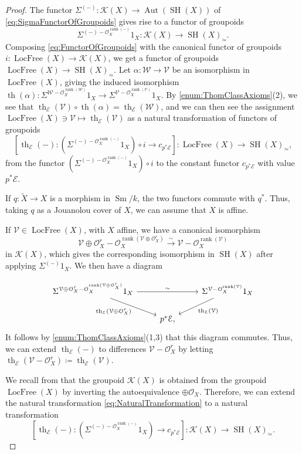 \documentclass[10pt]{amsart}
\theoremstyle{definition}
\theoremstyle{plain}
\numberwithin{equation}{section}
\newcommand{\0}{\emptyset}
\newcommand{\sE}{{\mathcal E}}
\newcommand{\sK}{{\mathcal K}}
\newcommand{\sO}{{\mathcal O}}
\newcommand{\sV}{{\mathcal V}}
\newcommand{\sW}{{\mathcal W}}
\newcommand{\SH}{{\operatorname{SH}}}
\newcommand{\Sm}{{\operatorname{Sm}}}
\renewcommand{\th}{{\operatorname{th}}}
\newcommand{\rnk}{{\operatorname{rank}}}
\newcommand{\Aut}{{\operatorname{Aut}}}
\newcommand{\Locfree}{{\operatorname{LocFree}}}
\begin{document}
\begin{proof}
    The functor $\Sigma^{(-)}:\sK(X)\to \Aut(\SH(X))$ of \eqref{eq:SigmaFunctorOfGroupoids} gives rise to a functor of groupoids 
    \begin{equation}
    \label{eq:FunctorOfGroupoids}
        \Sigma^{(-)-\sO_X^{\rnk(-)}}1_X:\sK(X)\to \SH(X)_\simeq.
    \end{equation}
Composing \eqref{eq:FunctorOfGroupoids} with the canonical functor of groupoids $i:\Locfree(X) \to \sK(X)$, we get a functor of groupoids $\Locfree(X) \to \SH(X)_\simeq$. Let $\alpha:\sW\to \sV$ be an isomorphism in  $\Locfree(X)$, giving the induced isomorphism $\th(\alpha):\Sigma^{\sW-\sO_X^{\rnk(\sW)}}1_X\to \Sigma^{\sV-\sO_X^{\rnk(\sV)}}1_X$. By \eqref{enum:ThomClassAxioms}(2), we see that $\th_\sE(\sV)\circ \th(\alpha)= \th_\sE(\sW)$, and we can then see the assignment $\Locfree(X) \ni \sV \mapsto \th_\sE(\sV)$ as a natural transformation of functors of groupoids 
\begin{equation}
    \label{eq:NaturalTransformation}
    [\th_\sE(-):(\Sigma^{(-)-\sO_X^{\rnk(-)}}1_X)\circ i\to c_{p^*\sE}]: \Locfree(X)\to \SH(X)_\simeq,
\end{equation}
from the functor $(\Sigma^{(-)-\sO_X^{\rnk(-)}}1_X)\circ i$ to the constant functor $c_{p^*\sE}$ with value $p^*\sE$.

If $q:\tilde{X}\to X$ is a morphism in $\Sm/k$, the two functors commute with $q^*$. Thus, taking $q$ as a Jouanolou cover of $X$, we can assume that $X$ is affine. 

If $\sV \in \Locfree(X)$, with $X$ affine, we have a canonical isomorphism $$\sV\oplus \sO_X^r-\sO_X^{\rnk(\sV\oplus \sO_X^r)} \xrightarrow{\sim} \sV-\sO_X^{\rnk(\sV)}$$
in $\sK(X)$, which gives the corresponding isomorphism in $\SH(X)$ after applying $\Sigma^{(-)}1_X$. We then have a diagram
   
$$
\begin{tikzcd}
        \Sigma^{\sV\oplus \sO_X^r-\sO_X^{\rnk(\sV\oplus \sO_X^r)}}1_X \arrow[rr, "\sim"] \arrow[dr, swap, "\th_\sE(\sV\oplus \sO_X^r)"] & & \Sigma^{\sV-\sO_X^{\rnk(\sV)}}1_X \arrow[dl, "\th_\sE(\sV)"] \\
        & p^*\sE, &
\end{tikzcd}
$$
It follows by \eqref{enum:ThomClassAxioms}(1,3) that this diagram commutes. Thus, we can extend $\th_\sE(-)$ to differences $\sV-\mathcal{O}_X^r$ by letting $\th_\sE(\sV-\mathcal{O}_X^r)\coloneqq \th_\sE(\sV)$.

We recall from \cite{Gra:Quillen} that the groupoid $\sK(X)$ is obtained from the groupoid $\Locfree(X)$ by inverting the autoequivalence $\oplus \mathcal{O}_X$. Therefore, we can extend the natural transformation \eqref{eq:NaturalTransformation} to a natural transformation
$$[\th_\sE(-):(\Sigma^{(-)-\sO_X^{\rnk(-)}}1_X)\to c_{p^*\sE}]:\sK(X)\to \SH(X)_\simeq.$$
\end{proof}
\end{document}
